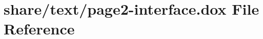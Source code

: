 \hypertarget{page2-interface_8dox}{}\section{share/text/page2-\/interface.dox File Reference}
\label{page2-interface_8dox}
